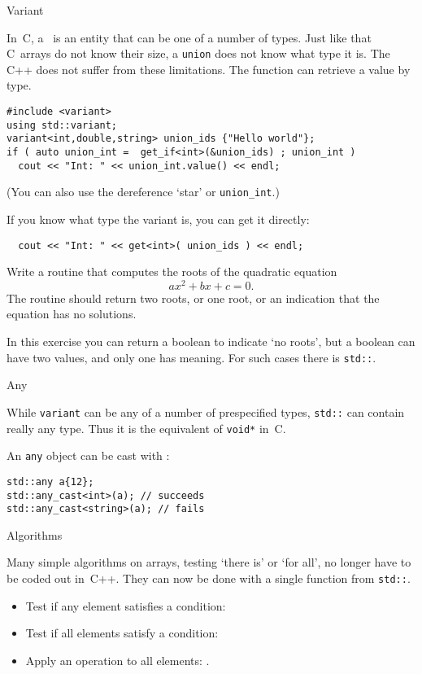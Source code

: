  {Variant}
\label{sec:stl-variant}

In~C, a~ is an entity that can be one of a number
of types. Just like that C~arrays do not know their size, a
\lstinline{union} does not know what type it is. The C++
 does not suffer from these limitations. The
function  can retrieve a value by type.

\begin{lstlisting}
#include <variant>
using std::variant;
variant<int,double,string> union_ids {"Hello world"};
if ( auto union_int =  get_if<int>(&union_ids) ; union_int )
  cout << "Int: " << union_int.value() << endl;
\end{lstlisting}
(You can also use the dereference `star' or \lstinline{union_int}.)

If you know what type the variant is, you
can get it directly:
\begin{lstlisting}
  cout << "Int: " << get<int>( union_ids ) << endl;
\end{lstlisting}

\begin{exercise}
  Write a routine that computes the roots of the quadratic equation
  \[ ax^2+bx+c=0. \]
  The routine should return two roots, or one root, or an indication
  that the equation has no solutions.
\end{exercise}

In this exercise you can return a boolean to indicate `no roots', but
a boolean can have two values, and only one has meaning. For such
cases there is \lstinline{std::}.

 {Any}
\label{sec:stl-any}

While \lstinline{variant} can be any of a number of prespecified
types, \lstinline{std::} can contain really any
type. Thus it is the equivalent of \lstinline{void*} in~C.

An \lstinline{any} object can be cast with :
\begin{lstlisting}
std::any a{12};
std::any_cast<int>(a); // succeeds
std::any_cast<string>(a); // fails
\end{lstlisting}

 {Algorithms}
\label{sec:algorithm}

Many simple algorithms on arrays, testing `there is' or `for all', no
longer have to be coded out in~C++. They can now be done with a single
function from \lstinline{std::}.
\begin{itemize}
\item Test if any element satisfies a condition:
\item Test if all elements satisfy a condition:
\item Apply an operation to all elements: .
\end{itemize}

